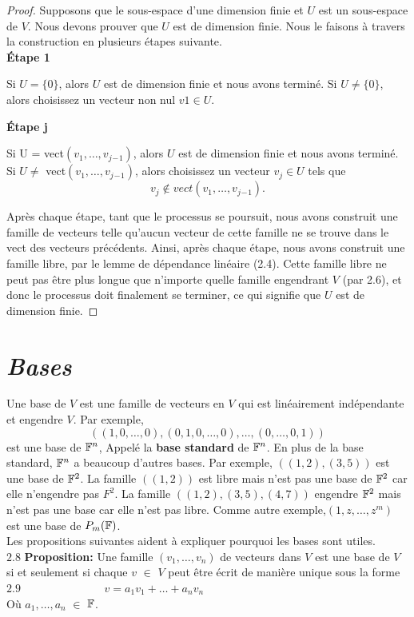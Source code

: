 \documentclass[12pt]{book}
\begin{document}
\begin{proof}
Supposons que le sous-espace d’une dimension finie et $U$ est un sous-espace de $V$. Nous devons prouver que $U $ est de dimension finie. Nous le faisons à travers la construction en plusieurs \'etapes suivante.\\
 \textbf{\'Etape 1}
\begin{indpar}
Si $U = \{0\}$, alors $U$ est de dimension finie et nous avons termin\'e. Si $U \ne \{0\}$, alors choisissez un vecteur non nul $v1 \in U$.
\end{indpar}
\textbf{\'Etape j}
\begin{indpar}
Si U = vect$(v_1,\ldots,v_j{_-}_1)$, alors $U$ est de dimension finie et nous avons termin\'e. Si $U \ne$ vect$(v_1,\ldots,v_j{_-}_1)$, alors choisissez un vecteur $v_j \in U$ tels que 
\begin{equation*}
    v_j \notin vect(v_1,\ldots,v_j{_-}_1).
\end{equation*}
\end{indpar}
Apr\`es chaque \'etape, tant que le processus se poursuit, nous avons construit une famille de vecteurs telle qu’aucun vecteur de cette famille ne se trouve dans le vect des vecteurs pr\'ec\'edents. Ainsi, apr\`es chaque \'etape, nous avons construit une famille libre, par le lemme de dépendance linéaire (2.4). Cette famille libre ne peut pas \^etre plus longue que n’importe quelle famille engendrant $V$ (par 2.6), et donc le processus doit finalement se terminer, ce qui signifie que $U $ est de dimension finie.
\end{proof}

\section*{\textsl{Bases}}
Une {base} de $V$ est une famille de vecteurs en $V$ qui est linéairement indépendante et engendre $V$. Par exemple,
\begin{equation*}
    ((1,0,\ldots,0),(0,1,0,\ldots,0),\ldots,(0,\ldots,0,1))
\end{equation*}
est une base de $\mathbb{F}^n$, Appelé la \textbf{base standard} de $\mathbb{F}^n$. En plus de la base standard, $\mathbb{F}^n$ a beaucoup d’autres bases. Par exemple, $((1,2),(3,5))$ est une base de $\mathbb{F}^2$. La famille $((1,2))$ est libre mais n’est pas une base de $\mathbb{F}^2$ car elle n'engendre pas $F^2$. La famille $((1,2),(3,5),(4,7))$ engendre $\mathbb{F}^2$ mais n'est pas une base car elle n'est pas libre. Comme autre exemple,$(1,z,\ldots,z^m)$ est une base de $P_m(\mathbb{F})$.\\
\indent
Les propositions suivantes aident à expliquer pourquoi les bases sont utiles.\\
$\bm{2.8}$\hspace{0,5cm} \textbf{Proposition:}\hspace{0,25cm} Une famille $(v_1,\ldots,v_n)$ de vecteurs dans $V$ est une base de $V$ si et seulement si chaque $v$ $\in$ $V$ peut être écrit de manière unique sous la forme\\
$\bm{2.9}\hspace{3cm}$ $v = a_1v_1 +\ldots+ a_nv_n$\\
O\`u $a_1,\ldots,a_n$ $\in$ $\mathbb{F}$.
\end{document}
